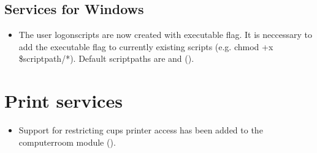  



\subsection{Services for Windows}
\begin{itemize}
\item The user logonscripts are now created with executable flag.
 It is neccessary to add the executable flag to currently existing scripts (e.g. chmod +x \$scriptpath/*).
 Default scriptpaths are  and  ().
\end{itemize}

%

\section{Print services}
\begin{itemize}
\item Support for restricting cups printer access has been added to the computerroom module ().
\end{itemize}

